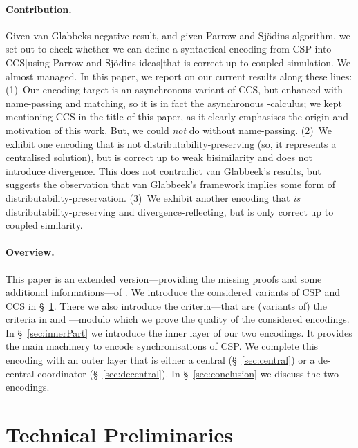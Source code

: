 \documentclass[]{eptcs}
\begin{document}
\paragraph{Contribution.}
Given van Glabbeks negative result, and given Parrow and Sj\"odins algorithm, we set out to check whether we can define a syntactical encoding from CSP into CCS|using Parrow and Sj\"odins ideas|that is correct up to coupled simulation. We almost managed. In this paper, we report on our current results along these lines: 
(1)~Our encoding target is an asynchronous variant of CCS, but enhanced with name-passing and matching, so it is in fact the asynchronous -calculus; we kept mentioning CCS in the title of this paper, as it clearly emphasises the origin and motivation of this work. But, we could \emph{not} do without name-passing.
(2)~We exhibit one encoding that is not distributability-preserving (so, it represents a centralised solution), but is correct up to weak bisimilarity and does not introduce divergence. This does not contradict van Glabbeek's results, but suggests the observation that van Glabbeek's framework implies some form of distributability-preservation.
(3)~We exhibit another encoding that \emph{is} distributability-preserving and divergence-reflecting, but is only correct up to coupled similarity.

\paragraph{Overview.}
This paper is an extended version---providing the missing proofs and some additional in\-for\-ma\-tions---of \cite{hatzel15}.
We introduce the considered variants of CSP and CCS in \S~\ref{sec:techPrel}. There we also introduce the criteria---that are (variants of) the criteria in \cite{gorla10} and \cite{petersNestmannGoltz13}---modulo which we prove the quality of the considered encodings. In \S~\ref{sec:innerPart} we introduce the inner layer of our two encodings. It provides the main machinery to encode synchronisations of CSP. We complete this encoding with an outer layer that is either a central (\S~\ref{sec:central}) or a de-central coordinator (\S~\ref{sec:decentral}). In \S~\ref{sec:conclusion} we discuss the two encodings.



\section{Technical Preliminaries}
\label{sec:techPrel}
\end{document}
